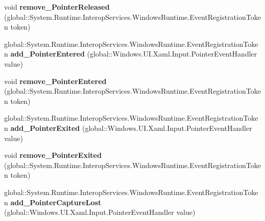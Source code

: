 \begin{DoxyCompactItemize}
\mbox{\label{interface_windows_1_1_u_i_1_1_xaml_1_1_i_u_i_element_abd23ebff773fb5a9158d2ee59097988e}} 
void {\bfseries remove\+\_\+\+Pointer\+Released} (global\+::\+System.\+Runtime.\+Interop\+Services.\+Windows\+Runtime.\+Event\+Registration\+Token token)
\item 
\mbox{\label{interface_windows_1_1_u_i_1_1_xaml_1_1_i_u_i_element_a54194f94b331caa84198af8f0147c1f1}} 
global\+::\+System.\+Runtime.\+Interop\+Services.\+Windows\+Runtime.\+Event\+Registration\+Token {\bfseries add\+\_\+\+Pointer\+Entered} (global\+::\+Windows.\+U\+I.\+Xaml.\+Input.\+Pointer\+Event\+Handler value)
\item 
\mbox{\label{interface_windows_1_1_u_i_1_1_xaml_1_1_i_u_i_element_a97fd59b642c8546d197cd5ffebe213bf}} 
void {\bfseries remove\+\_\+\+Pointer\+Entered} (global\+::\+System.\+Runtime.\+Interop\+Services.\+Windows\+Runtime.\+Event\+Registration\+Token token)
\item 
\mbox{\label{interface_windows_1_1_u_i_1_1_xaml_1_1_i_u_i_element_a692d43ef89399af622b349c4c0ac5249}} 
global\+::\+System.\+Runtime.\+Interop\+Services.\+Windows\+Runtime.\+Event\+Registration\+Token {\bfseries add\+\_\+\+Pointer\+Exited} (global\+::\+Windows.\+U\+I.\+Xaml.\+Input.\+Pointer\+Event\+Handler value)
\item 
\mbox{\label{interface_windows_1_1_u_i_1_1_xaml_1_1_i_u_i_element_a934eefa2b5181fd9b0c19d7b6536d6d9}} 
void {\bfseries remove\+\_\+\+Pointer\+Exited} (global\+::\+System.\+Runtime.\+Interop\+Services.\+Windows\+Runtime.\+Event\+Registration\+Token token)
\item 
\mbox{\label{interface_windows_1_1_u_i_1_1_xaml_1_1_i_u_i_element_a4600eed2eadce86aaa8771cc8aedbb0d}} 
global\+::\+System.\+Runtime.\+Interop\+Services.\+Windows\+Runtime.\+Event\+Registration\+Token {\bfseries add\+\_\+\+Pointer\+Capture\+Lost} (global\+::\+Windows.\+U\+I.\+Xaml.\+Input.\+Pointer\+Event\+Handler value)
\item 

\end{DoxyCompactItemize}
